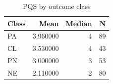 \begin{table}
\caption{PQS by outcome class}
\label{tab:pqs-by-outcome}
\begin{tabular}{lrrr}
\toprule
Class & Mean & Median & N \\
\midrule
PA & 3.960000 & 4 & 89 \\
CL & 3.530000 & 4 & 43 \\
PN & 3.000000 & 3 & 53 \\
NE & 2.110000 & 2 & 80 \\
\bottomrule
\end{tabular}
\end{table}
